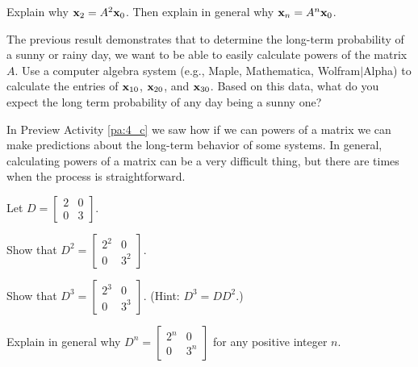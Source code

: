 \begin{pa}
\item  Explain why $\mathbf{x}_2 = A^2 \mathbf{x}_0$. Then explain in general why $\mathbf{x}_n = A^n \mathbf{x}_0$. 

\item The previous result demonstrates that to determine the long-term probability of a sunny or rainy day, we want to be able to easily calculate powers of the matrix $A$. Use a computer algebra system (e.g., Maple, Mathematica, Wolfram$|$Alpha) to calculate the entries of $\mathbf{x}_{10}$, $\mathbf{x}_{20}$, and $\mathbf{x}_{30}$.  Based on this data, what do you expect the long term probability of any day being a sunny one? 

\ee

\end{pa}


\label{sec:diag}


In Preview Activity \ref{pa:4_c} we saw how if we can powers of a matrix we can make predictions about the long-term behavior of some systems. In general, calculating powers of a matrix can be a very difficult thing, but there are times when the process is straightforward. 

\begin{activity} \label{act:4_c_0} Let $D = \left[ \begin{array}{cc} 2&0 \\ 0&3 \end{array} \right]$. 
	\ba
	\item Show that $D^2 = \left[ \begin{array}{cc} 2^2&0 \\ 0&3^2 \end{array} \right]$.

	\item Show that $D^3 = \left[ \begin{array}{cc} 2^3&0 \\ 0&3^3 \end{array} \right]$. (Hint: $D^3 = DD^2$.)

	\item Explain in general why $D^n = \left[ \begin{array}{cc} 2^n&0 \\ 0&3^n \end{array} \right]$ for any positive integer $n$.

	\ea
\end{activity}

